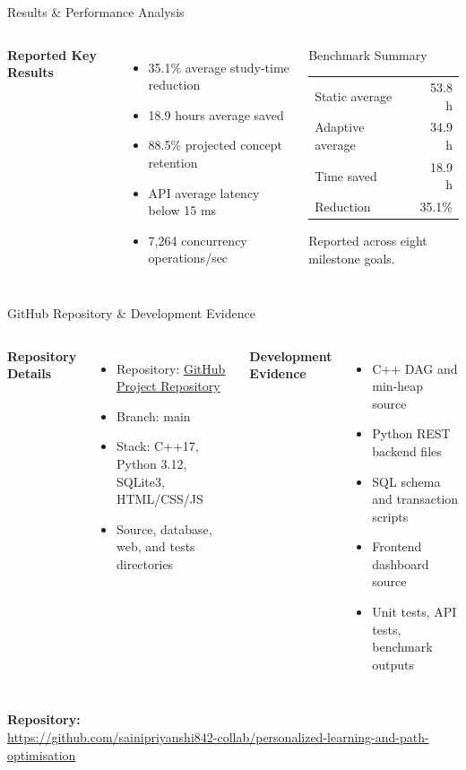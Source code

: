 \documentclass[aspectratio=169,11pt]{beamer}
\begin{document}
\begin{frame}{Results \& Performance Analysis}
\begin{columns}[T,totalwidth=\textwidth]
\textbf{Reported Key Results}
\begin{itemize}\itemsep3pt
\item 35.1\% average study-time reduction
\item 18.9 hours average saved
\item 88.5\% projected concept retention
\item API average latency below 15 ms
\item 7,264 concurrency operations/sec
\end{itemize}
\begin{block}{Benchmark Summary}
\centering
\begin{tabular}{@{}lr@{}}
Static average & 53.8 h\\
Adaptive average & 34.9 h\\
Time saved & 18.9 h\\
Reduction & 35.1\%\\
\end{tabular}
\vspace{2mm}
\small Reported across eight milestone goals.
\end{block}
\end{columns}
\end{frame}

\begin{frame}{GitHub Repository \& Development Evidence}
\begin{columns}[T,totalwidth=\textwidth]
\textbf{Repository Details}
\begin{itemize}\itemsep3pt
\item Repository: \href{https://github.com/sainipriyanshi842-collab/personalized-learning-and-path-optimisation}{GitHub Project Repository}
\item Branch: main
\item Stack: C++17, Python 3.12, SQLite3, HTML/CSS/JS
\item Source, database, web, and tests directories
\end{itemize}
\textbf{Development Evidence}
\begin{itemize}\itemsep3pt
\item C++ DAG and min-heap source
\item Python REST backend files
\item SQL schema and transaction scripts
\item Frontend dashboard source
\item Unit tests, API tests, benchmark outputs
\end{itemize}
\end{columns}
\vfill
\begin{center}\colorbox{GEULightBlue}{\parbox{.88\textwidth}{\centering\textbf{Repository:} \\ \url{https://github.com/sainipriyanshi842-collab/personalized-learning-and-path-optimisation}}}\end{center}
\end{frame}
\end{document}
